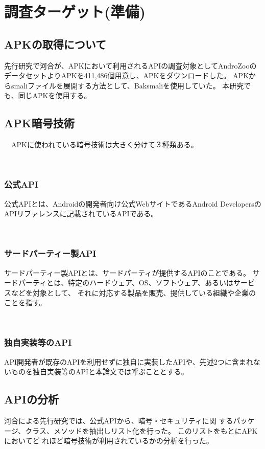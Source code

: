 \newpage

\section{調査ターゲット(準備)}
\subsection {APKの取得について}

先行研究で河合が、APKにおいて利用されるAPIの調査対象としてAndroZooのデータセットよりAPKを411,486個用意し、APKをダウンロードした。
APKからsmaliファイルを展開する方法として、Baksmaliを使用していた。
本研究でも、同じAPKを使用する。

\subsection{APK暗号技術}
　APKに使われている暗号技術は大きく分けて３種類ある。

　\subsubsection {公式API}
公式APIとは、Androidの開発者向け公式WebサイトであるAndroid DevelopersのAPIリファレンスに記載されているAPIである。

　\subsubsection {サードパーティー製API}
サードパーティー製APIとは、サードパーティが提供するAPIのことである。
サードパーティとは、特定のハードウェア、OS、ソフトウェア、あるいはサービスなどを対象として、
それに対応する製品を販売、提供している組織や企業のことを指す。

　\subsubsection {独自実装等のAPI}
API開発者が既存のAPIを利用せずに独自に実装したAPIや、先述2つに含まれないものを独自実装等のAPIと本論文では呼ぶこととする。

\subsection{APIの分析}
河合による先行研究では、公式APIから、暗号・セキュリティに関
するパッケージ、クラス、メソッドを抽出しリスト化を行った。
このリストをもとにAPKにおいてど
れほど暗号技術が利用されているかの分析を行った。

